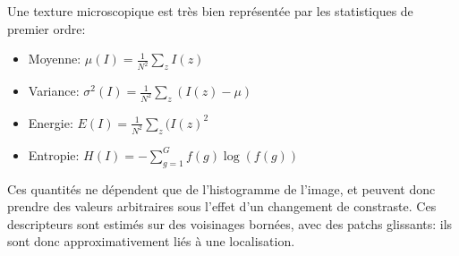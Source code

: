 \documentclass{article}
\begin{document}
Une texture microscopique est très bien représentée par les statistiques de
premier ordre:
\begin{itemize}
\item Moyenne: $\mu(I) = \frac{1}{N^2} \sum_z I(z)$
\item Variance: $\sigma^2(I) = \frac{1}{N^2} \sum_z (I(z) - \mu)$
\item Energie: $E(I) = \frac{1}{N^2} \sum_z (I(z)^2$
\item Entropie: $H(I) = - \sum_{g = 1}^G f(g) \log(f(g))$
\end{itemize}

Ces quantités ne dépendent que de l'histogramme de l'image, et peuvent donc
prendre des valeurs arbitraires sous l'effet d'un changement de constraste.
Ces descripteurs  sont estimés sur des voisinages bornées, avec des patchs
glissants: ils sont donc approximativement liés à une localisation.


\end{document}

